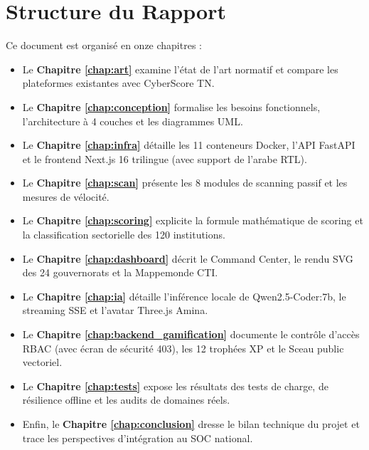 \section{Structure du Rapport}
Ce document est organisé en onze chapitres :
\begin{itemize}
    \item Le \textbf{Chapitre \ref{chap:art}} examine l'état de l'art normatif et compare les plateformes existantes avec CyberScore TN.
    \item Le \textbf{Chapitre \ref{chap:conception}} formalise les besoins fonctionnels, l'architecture à 4 couches et les diagrammes UML.
    \item Le \textbf{Chapitre \ref{chap:infra}} détaille les 11 conteneurs Docker, l'API FastAPI et le frontend Next.js 16 trilingue (avec support de l'arabe RTL).
    \item Le \textbf{Chapitre \ref{chap:scan}} présente les 8 modules de scanning passif et les mesures de vélocité.
    \item Le \textbf{Chapitre \ref{chap:scoring}} explicite la formule mathématique de scoring et la classification sectorielle des 120 institutions.
    \item Le \textbf{Chapitre \ref{chap:dashboard}} décrit le Command Center, le rendu SVG des 24 gouvernorats et la Mappemonde CTI.
    \item Le \textbf{Chapitre \ref{chap:ia}} détaille l'inférence locale de Qwen2.5-Coder:7b, le streaming SSE et l'avatar Three.js Amina.
    \item Le \textbf{Chapitre \ref{chap:backend_gamification}} documente le contrôle d'accès RBAC (avec écran de sécurité 403), les 12 trophées XP et le Sceau public vectoriel.
    \item Le \textbf{Chapitre \ref{chap:tests}} expose les résultats des tests de charge, de résilience offline et les audits de domaines réels.
    \item Enfin, le \textbf{Chapitre \ref{chap:conclusion}} dresse le bilan technique du projet et trace les perspectives d'intégration au SOC national.
\end{itemize}
